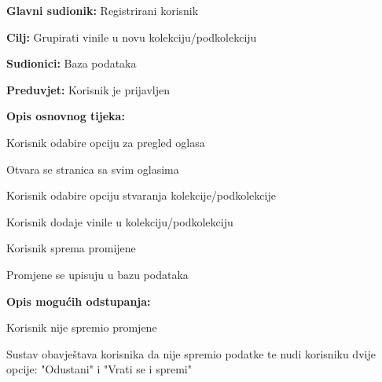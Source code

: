 				\noindent {}
					\begin{packed_item}
	
						\item \textbf{Glavni sudionik: }Registrirani korisnik
						\item  \textbf{Cilj:} Grupirati vinile u novu kolekciju/podkolekciju
						\item  \textbf{Sudionici:} Baza podataka
						\item  \textbf{Preduvjet:} Korisnik je prijavljen
						\item  \textbf{Opis osnovnog tijeka:}
						
						\item[] \begin{packed_enum}
	
							\item Korisnik odabire opciju za pregled oglasa
							\item Otvara se stranica sa svim oglasima
							\item Korisnik odabire opciju stvaranja kolekcije/podkolekcije
							\item Korisnik dodaje vinile u kolekciju/podkolekciju
							\item Korisnik sprema promijene
							\item Promjene se upisuju u bazu podataka

						\end{packed_enum}
						
						\item  \textbf{Opis mogućih odstupanja:}
						
						\item[] \begin{packed_item}
	
							\item[5.a] Korisnik nije spremio promjene
								\begin{packed_item}
									\item Sustav obavještava korisnika da nije spremio podatke te nudi korisniku dvije opcije: "Odustani" i "Vrati se i spremi"
								\end{packed_item}
								
						\end{packed_item}							
					\end{packed_item}
					
